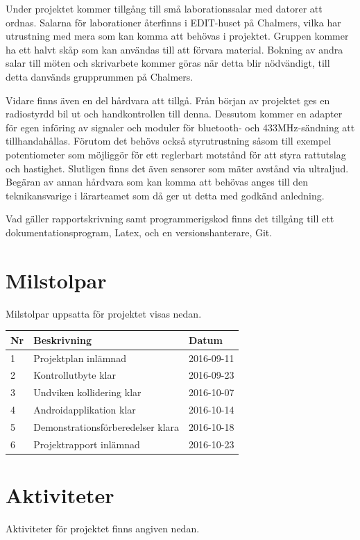 \documentclass[a4paper]{article}
\begin{document}
\vspace{5mm}
\noindent Under projektet kommer tillgång till små laborationssalar med datorer att ordnas. Salarna för laborationer återfinns i EDIT-huset på Chalmers, vilka har utrustning med mera som kan komma att behövas i projektet. Gruppen kommer ha ett halvt skåp som kan användas till att förvara material. Bokning av andra salar till möten och skrivarbete kommer göras när detta blir nödvändigt, till detta danvänds grupprummen på Chalmers.

Vidare finns även en del hårdvara att tillgå. Från början av projektet ges en radiostyrdd bil ut och handkontrollen till denna. Dessutom kommer en adapter för egen införing av signaler och moduler för bluetooth- och 433MHz-sändning att tillhandahållas. Förutom det behövs också styrutrustning såsom till exempel potentiometer som möjliggör för ett reglerbart motstånd för att styra rattutslag och hastighet. Slutligen finns det även sensorer som mäter avstånd via ultraljud. Begäran av annan hårdvara som kan komma att behövas anges till den teknikansvarige i lärarteamet som då ger ut detta med godkänd anledning.
 
Vad gäller rapportskrivning samt programmerigskod finns det tillgång till ett dokumentationsprogram, Latex, och en versionshanterare, Git. 

\section{Milstolpar}
Milstolpar uppsatta för projektet visas nedan.
\vspace{5mm}

\begin{tabular}{|l|l|l|} \hline
\bf Nr & \bf Beskrivning & \bf Datum \\ \hline \hline
1 & Projektplan inlämnad & 2016-09-11 \\\hline
2 & Kontrollutbyte klar & 2016-09-23 \\ \hline
3 & Undviken kollidering klar & 2016-10-07 \\ \hline
4 & Androidapplikation klar & 2016-10-14 \\ \hline
5 & Demonstrationsförberedelser klara & 2016-10-18 \\ \hline
6 & Projektrapport inlämnad & 2016-10-23 \\ \hline

\end{tabular}

\section{Aktiviteter}
Aktiviteter för projektet finns angiven nedan.
\vspace{5mm}
\end{document}
